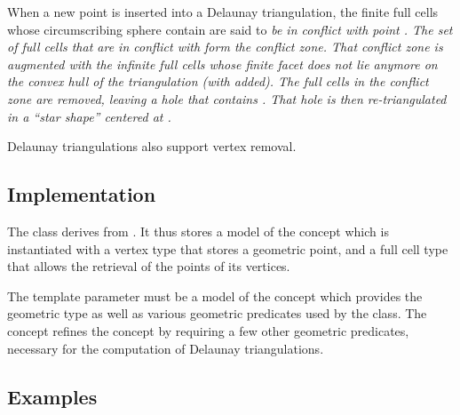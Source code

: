 
When a new point  is inserted into a Delaunay triangulation, the
finite full cells whose circumscribing sphere contain  are said to
\em{be in conflict} with point . The set of full cells that are in
conflict with  form the \em{conflict zone}. That conflict zone is
augmented with the infinite full cells whose finite facet does not lie
anymore on the convex hull of the triangulation (with  added). The full cells
in the conflict zone are removed, leaving a hole that contains . That
hole is then re-triangulated in a ``star shape'' centered at .

Delaunay triangulations also support vertex removal.


\subsection{Implementation}

The class  derives from
. It thus stores a model \tds of
the concept  which is instantiated with a vertex
type that stores a geometric point, and a full cell type that allows the
retrieval of the points of its vertices.

The template parameter  must be a model of the concept
 which provides the geometric  type as
well as various geometric predicates used by the  class.
The concept  refines the concept
 by requiring a few other geometric predicates, necessary
for the computation of Delaunay triangulations.


\subsection{Examples}

